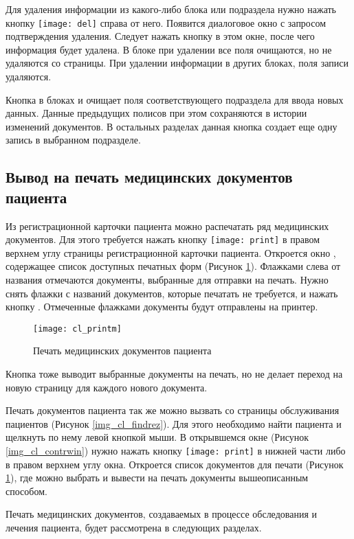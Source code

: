 Для удаления информации из какого-либо блока или подраздела нужно нажать кнопку \texttt{[image: del]} справа от  него. Появится диалоговое окно с запросом подтверждения удаления. Следует нажать кнопку  в этом окне, после чего информация будет удалена. В блоке  при удалении все поля очищаются, но не удаляются со страницы. При удалении информации в других блоках, поля записи удаляются.

Кнопка  в блоках  и  очищает поля соответствующего подраздела для ввода новых данных. Данные предыдущих полисов при этом сохраняются в истории изменений документов. В остальных разделах данная кнопка создает еще одну запись в выбранном подразделе.

\subsection{Вывод на печать медицинских документов пациента}

Из регистрационной карточки пациента можно распечатать ряд медицинских документов. Для этого требуется нажать кнопку \texttt{[image: print]} в правом верхнем углу страницы регистрационной карточки пациента. Откроется окно , содержащее список доступных печатных форм (Рисунок \ref{img_cl_printm}). Флажками слева от названия отмечаются документы, выбранные для отправки на печать. Нужно снять флажки с названий документов, которые печатать не требуется, и нажать кнопку . Отмеченные флажками документы будут отправлены на принтер.

\begin{figure}[ht]\centering
 \texttt{[image: cl\_printm]}
 \caption{Печать медицинских документов пациента}
 \label{img_cl_printm}
\end{figure} 

Кнопка  тоже выводит выбранные документы на печать, но не делает переход на новую страницу для каждого нового документа.

Печать документов пациента так же можно вызвать со страницы обслуживания пациентов (Рисунок \ref{img_cl_findrez}). Для этого необходимо найти пациента и щелкнуть по нему левой кнопкой мыши. В открывшемся окне (Рисунок \ref{img_cl_contrwin}) нужно нажать кнопку \texttt{[image: print]} в нижней части либо в правом верхнем углу окна. Откроется список документов для печати (Рисунок \ref{img_cl_printm}), где можно выбрать и вывести на печать документы вышеописанным способом. 
   
Печать медицинских документов, создаваемых в процессе обследования и лечения пациента, будет рассмотрена в следующих разделах.

